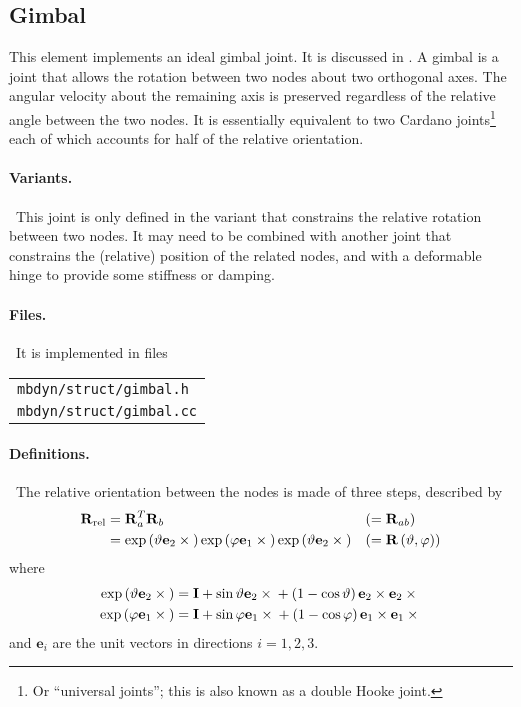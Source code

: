 \documentclass[10pt,dvips,fleqn,subeqn]{report}
\newcommand{\T}[1]{\bm{\mathbf{#1}}}
\begin{document}
\subsection{Gimbal}
\label{sec:GimbalRotationJoint}
This element implements an ideal gimbal joint.
It is discussed in \cite{GIMBAL}.
A gimbal is a joint that allows the rotation between two nodes
about two orthogonal axes.
The angular velocity about the remaining axis is preserved regardless
of the relative angle between the two nodes.
It is essentially equivalent to two Cardano joints\footnote{Or
``universal joints''; this is also known as a double Hooke joint.}
each of which accounts for half of the relative orientation.

\paragraph{Variants.} \
This joint is only defined in the variant that constrains the relative
rotation between two nodes.
It may need to be combined with another joint that constrains
the (relative) position of the related nodes,
and with a deformable hinge to provide some stiffness or damping.

\paragraph{Files.} \
It is implemented in files

\begin{tabular}{l}
\texttt{mbdyn/struct/gimbal.h} \\
\texttt{mbdyn/struct/gimbal.cc}
\end{tabular}

\paragraph{Definitions.} \
The relative orientation between the nodes is made of three steps,
described by
\begin{subequations}
\begin{align}
	\T{R}_{\text{rel}}
	&= \T{R}_a^T \T{R}_b & & ( = \T{R}_{ab} )
	\label{eq:gimbal:R_a_b} \\
	&= \llk{exp}\plbr{\vartheta \T{e}_2 \times{}}
		\llk{exp}\plbr{\varphi \T{e}_1 \times{}}
		\llk{exp}\plbr{\vartheta \T{e}_2 \times{}}
	& & ( = \T{R}\plbr{\vartheta, \varphi} )
	\label{eq:gimbal:R_theta_phi}
\end{align}
\end{subequations}
where
\begin{subequations}
\begin{align}
	\llk{exp}\plbr{\vartheta \T{e}_2 \times{}} &=
		\T{I} + \sin\vartheta \T{e}_2\times{}
			+ \plbr{1 - \cos\vartheta}\T{e}_2\times\T{e}_2\times{}
		\label{eq:GIMBAL-EXP-THETA} \\
	\llk{exp}\plbr{\varphi \T{e}_1 \times{}} &=
		\T{I} + \sin\varphi \T{e}_1\times{}
			+ \plbr{1 - \cos\varphi}\T{e}_1\times\T{e}_1\times{}
		\label{eq:GIMBAL-EXP-PHI}
\end{align}
\end{subequations}
and $\T{e}_i$ are the unit vectors in directions $i=1,2,3$.
\end{document}
